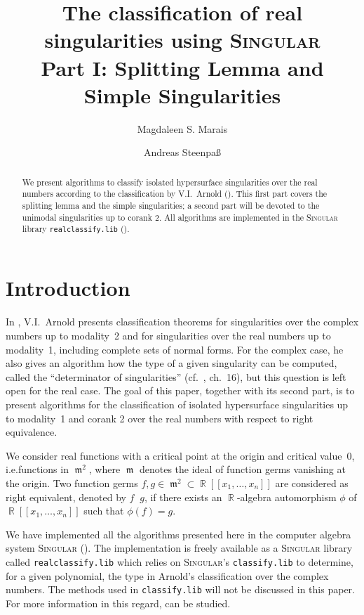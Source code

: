 \documentclass[noend]{amsproc}
\title[The classification of real singularities using \textsc{Singular}, %
Part I]%
{The classification of real singularities using \textsc{Singular}\\
Part I: Splitting Lemma and Simple Singularities}
\author{Magdaleen S. Marais}
\author{Andreas Steenpa\ss}
\theoremstyle{definition}
\newcommand{\Singular}{\textsc{Singular}}
\newcommand{\realclassify}{\texttt{realclassify.lib}}
\newcommand{\classify}{\texttt{classify.lib}}
\DeclareMathOperator{\requiv}{\overset{r}{\sim}}
\DeclareMathOperator{\m}{\mathfrak{m}}
\DeclareMathOperator{\R}{\mathbb{R}}
\begin{document}
\begin{abstract}
We present algorithms to classify isolated hypersurface singularities over the
real numbers according to the classification by V.I.~Arnold (\cite{AVG1985}).
This first part covers the splitting lemma and the simple singularities; a
second part will be devoted to the unimodal singularities up to corank 2.
All algorithms are implemented in the \Singular{} library \realclassify{}
(\cite{realclassify}).
\end{abstract}

\maketitle


\section{Introduction}
In \cite{AVG1985}, V.I.~Arnold presents classification theorems for
singularities over the complex numbers up to modality~2 and for singularities
over the real numbers up to modality~1, including complete sets of normal
forms. For the complex case, he also gives an algorithm how the type of a given
singularity can be computed, called the ``determinator of singularities''
(cf.~\cite{AVG1985}, ch.~16), but this question is left open for the real case.
The goal of this paper, together with its second part, is to present algorithms
for the classification of isolated hypersurface singularities up to modality~1
and corank 2 over the real numbers with respect to right equivalence.

We consider real functions with a critical point at the origin and critical
value~$0$, i.e.\@ functions in $\m^2$, where $\m$ denotes the ideal of function
germs vanishing at the origin. Two function germs $f, g \in \m^2 \subset
\R[[x_1,\ldots,x_n]]$ are considered as right equivalent, denoted by
$f \requiv g$, if there exists an $\R$-algebra automorphism $\phi$ of
$\R[[x_1,\ldots,x_n]]$ such that $\phi(f) = g$.

We have implemented all the algorithms presented here in the computer algebra
system \Singular{} (\cite{DGPS}). The implementation is freely available as a
\Singular{} library called \realclassify{} which relies on \Singular's
\classify{} to determine, for a given polynomial, the type in Arnold's
classification over the complex numbers. The methods used in \classify{} will
not be discussed in this paper. For more information in this regard,
\cite{Kruger} can be studied.
\end{document}
